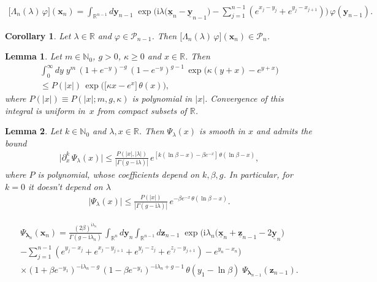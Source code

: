 \documentclass[10pt,a4paper]{amsart}
\newtheorem{corollary}{Corollary}
\newtheorem{lemma}{Lemma}
\renewcommand{\imath}{\mathrm{i}}
\renewcommand{\phi}{\varphi}
\begin{document}
\begin{align} \label{L-def0}
	\bigl[ \Lambda_n(\lambda) \, \phi \bigr] (\bm{x}_n) = \int_{\mathbb{R}^{n - 1}} d\bm{y}_{n - 1} \; \exp \biggl( \imath \lambda \bigl( \underline{\bm{x}}_n - \underline{\bm{y}}_{n - 1} \bigr) - \sum_{j = 1}^{n - 1} ( e^{x_j - y_j} + e^{y_j - x_{j + 1} } ) \biggr) \, \phi(\bm{y}_{n - 1}).
\end{align}

\begin{corollary} \label{cor:LP-inv}
	Let $\lambda \in \mathbb{R}$ and $\phi \in \mathcal{P}_{n - 1}$. Then $\bigl[ \Lambda_n(\lambda) \, \phi \bigr] (\bm{x}_n) \in \mathcal{P}_{n}$.
\end{corollary}

\begin{lemma} \label{lemma3}
	Let $m \in \mathbb{N}_0$, $g > 0$, $\kappa \geq 0$ and $x \in \mathbb{R}$. Then
	\begin{multline}\label{lem3}
		\int_{0}^\infty dy \; y^m  \, (1 + e^{-y})^{- g} \, (1 - e^{-y})^{g - 1} \, \exp\bigl(\kappa (y + x) - e^{y + x}\bigr) \\
		\leq P(|x|) \, \exp \bigl( \bigl[ \kappa x- e^{x} \bigr] \, \theta(x) \bigr),
	\end{multline}
	where  $P(|x|) \equiv P(|x|; m, g, \kappa)$ is polynomial in $|x|$. Convergence of this integral is uniform in~$x$ from compact subsets of $\mathbb{R}$.
\end{lemma}

\begin{lemma}\label{lemma4}
	Let $k \in \mathbb{N}_0$ and $\lambda, x\in \mathbb{R}$. Then $\Psi_\lambda(x)$ is smooth in $x$ and admits the bound
	\begin{align}
		\bigl| \partial_x^k \, \Psi_\lambda(x) \bigr| \leq \frac{P(|x|, |\lambda|)}{| \Gamma(g - \imath \lambda) |} \, e^{ [k (\ln \beta - x) - \beta e^{-x} ] \, \theta(\ln\beta-x)},
	\end{align}
	where $P$ is polynomial, whose coefficients depend on $k, \beta, g$. In particular, for $k = 0$ it doesn't depend on $\lambda$
	\begin{align}\label{Psi0-b}
		\bigl| \Psi_\lambda(x) \bigr| \leq \frac{P(|x|)}{| \Gamma(g - \imath \lambda) |} \, e^{ -  \beta e^{-x} \, \theta(\ln\beta-x)}.
	\end{align}
\end{lemma}

\begin{multline}\label{Psin}
	\Psi_{\bm{\lambda}_n}(\bm{x}_n) = \frac{(2\beta)^{\imath \lambda_n}}{\Gamma(g - \imath \lambda_n)} \, \int_{\mathbb{R}^n} d\bm{y}_n \int_{\mathbb{R}^{n - 1}} d\bm{z}_{n - 1} \; \exp \Biggl( \imath \lambda_n \bigl( \underline{\bm{x}}_n + \underline{\bm{z}}_{n - 1} - 2 \underline{\bm{y}}_n \bigr)  \\[4pt]
	- \sum_{j = 1}^{n - 1} ( e^{y_j - x_j} + e^{x_j - y_{j + 1}}  + e^{y_j - z_j} + e^{z_j - y_{j + 1}} ) - e^{y_n - x_n} \Biggr) \\[4pt]
	\times (1 + \beta e^{-y_1})^{- \imath \lambda_n - g} \, (1 - \beta e^{-y_1})^{- \imath \lambda_n + g - 1} \, \theta(y_1 - \ln \beta) \; \Psi_{\bm{\lambda}_{n - 1}}(\bm{z}_{n - 1}).
\end{multline}
\end{document}
